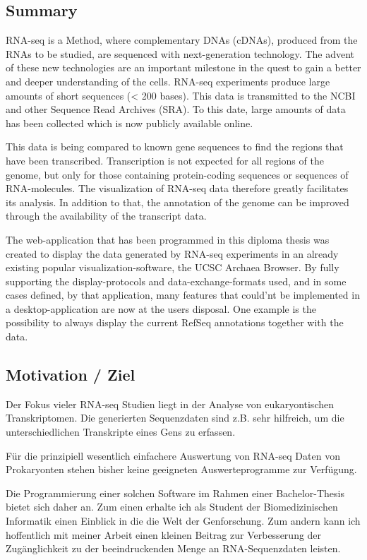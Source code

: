 \documentclass[a4paper]{thesis}
\begin{document}
\subsection{Summary}
RNA-seq is a Method, where complementary DNAs (cDNAs), produced from the RNAs to be studied, are sequenced with next-generation technology. The advent of these new technologies are an important milestone in the quest to gain a better and deeper understanding of the cells. RNA-seq experiments produce large amounts of short sequences (< 200 bases). This data is transmitted to the NCBI and other Sequence Read Archives (SRA). To this date, large amounts of data has been collected which is now publicly available online.

This data is being compared to known gene sequences to find the regions that have been transcribed. Transcription is not expected for all regions of the genome, but only for those containing protein-coding sequences or sequences of RNA-molecules. The visualization of RNA-seq data therefore greatly facilitates its analysis. In addition to that, the annotation of the genome can be improved through the availability of the transcript data.

The web-application that has been programmed in this diploma thesis was created to display the data generated by RNA-seq experiments in an already existing popular visualization-software, the UCSC Archaea Browser. By fully supporting the display-protocols and data-exchange-formats used, and in some cases defined, by that application, many features that could'nt be implemented in a desktop-application are now at the users disposal. One example is the possibility to always display the current RefSeq annotations together with the data.

\subsection{Motivation / Ziel}
Der Fokus vieler RNA-seq Studien liegt in der Analyse von
eukaryontischen Transkriptomen. Die generierten Sequenzdaten sind z.B. sehr
hilfreich, um die unterschiedlichen Transkripte eines Gens zu erfassen.

Für die prinzipiell wesentlich einfachere Auswertung von RNA-seq Daten von
Prokaryonten stehen bisher keine geeigneten Auswerteprogramme zur Verfügung.

Die Programmierung einer solchen Software im Rahmen einer Bachelor-Thesis
bietet sich daher an. Zum einen erhalte ich als Student der Biomedizinischen
Informatik einen Einblick in die die Welt der Genforschung. Zum andern kann ich
hoffentlich mit meiner Arbeit einen kleinen Beitrag zur Verbesserung der
Zugänglichkeit zu der beeindruckenden Menge an RNA-Sequenzdaten leisten.
\end{document}
